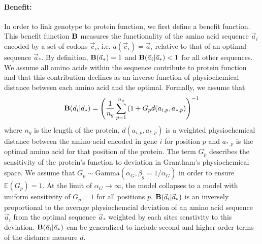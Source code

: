 \documentclass{article}
\newcommand{\EE}{\mathbb{E}} %
\newcommand{\Funcaoptvec}{\ensuremath{\Func(\aoptvec)}\xspace}
\newcommand{\Funcaveci}{\ensuremath{\Func(\aveci|\aoptvec)}\xspace}
\newcommand{\Func}{\ensuremath{\text{\textbf{B}}}\xspace}
\newcommand{\aip}{\ensuremath{a_{i,p}}\xspace}
\newcommand{\alphag}{\ensuremath{\alpha_G}\xspace}
\newcommand{\aoptp}{\ensuremath{a_{*,p}}\xspace}
\newcommand{\aoptvec}{\ensuremath{\Vec{a}_*}\xspace}
\newcommand{\aveci}{\ensuremath{\Vec{a}_i}\xspace}
\newcommand{\cveci}{\ensuremath{\cvec_i}\xspace}
\newcommand{\cvec}{\ensuremath{\Vec{c}}\xspace}
\renewcommand{\ng}{\ensuremath{{n_g}}\xspace}
\newcommand{\gp}{\ensuremath{{G_p}}\xspace}
\begin{document}
\paragraph*{Benefit: }
In order to link genotype to protein function, we first define a benefit function.
This benefit function \Func measures the functionality of the amino acid sequence \aveci encoded by a set of codons \cveci, i.e. $a(\cveci) = \aveci$ relative to that of an optimal sequence $\aoptvec$.
By definition,  $\Funcaoptvec = 1$ and $\Funcaveci < 1$ for all other sequences.
We assume all amino acids within the sequence contribute to protein function and that this contribution declines as an inverse function of physiochemical distance between each amino acid and the optimal.
Formally, we assume that 
\begin{equation}
\Funcaveci = \left(\frac{1}{\ng} \sum_{p=1}^\ng \left(1 + \gp d(\aip, \aoptp\right)\right)^{-1}
\end{equation}
where $\ng$ is the length of the protein, $d(\aip, \aoptp)$ is a weighted physiochemical distance between the amino acid encoded in gene $i$ for position $p$ and $\aoptp$ is the optimal amino acid for that position of the protein.
The term \gp describes the sensitivity of the protein's function to deviation in Grantham's physiochemical space.
We assume that  $\gp \sim \text{Gamma}\left(\alphag, \beta_g = 1/\alphag\right)$ in order to ensure $\EE(\gp) = 1$.
At the limit of $\alphag \rightarrow \infty$, the model collapses to a model with uniform sensitivity of $\gp = 1$ for all positions $p$.
\Funcaveci is an inversely proportional to the average physiochemcial deviation of an amino acid sequence \aveci from the optimal sequence \aoptvec weighted by each sites senstivity to this deviation.
\Funcaveci can be generalized to include second and higher order terms of the distance measure $d$.
\end{document}
